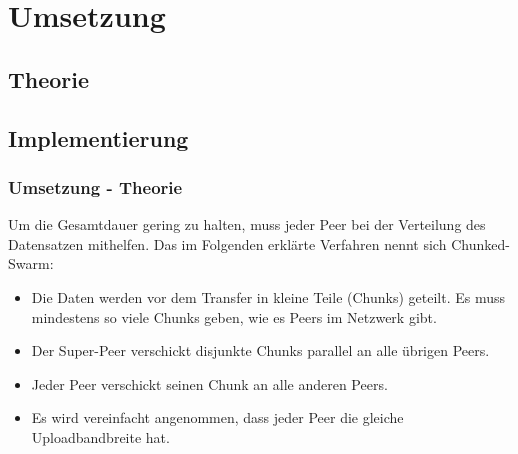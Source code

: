 
\section{Umsetzung}

\subsection{Theorie}
\subsection{Implementierung}

\begin{frame}
  \frametitle{Umsetzung - Theorie}

  Um die Gesamtdauer gering zu halten, muss jeder Peer bei der Verteilung des Datensatzen mithelfen. Das im Folgenden erklärte Verfahren nennt sich Chunked-Swarm:
  \begin{itemize}  
    \item Die Daten werden vor dem Transfer in kleine Teile (Chunks) geteilt. Es muss mindestens so viele Chunks geben, wie es Peers im Netzwerk gibt.

    \item Der Super-Peer verschickt disjunkte Chunks parallel an alle übrigen Peers.

    \item Jeder Peer verschickt seinen Chunk an alle anderen Peers.

    \item Es wird vereinfacht angenommen, dass jeder Peer die gleiche Uploadbandbreite hat.
  \end{itemize}	

\end{frame}





